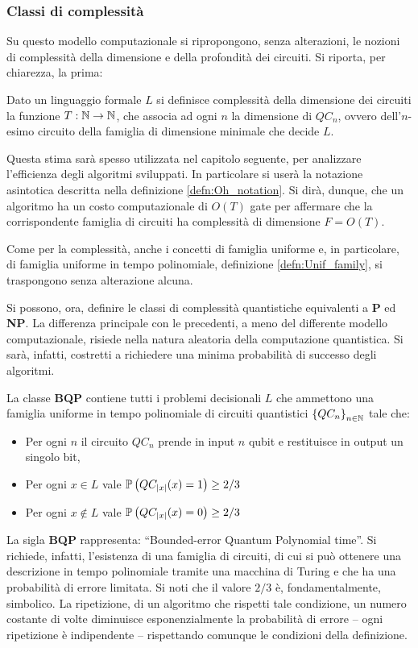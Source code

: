 \subsubsection{Classi di complessità}
Su questo modello computazionale si ripropongono, senza alterazioni, le nozioni di complessità della dimensione e della profondità dei circuiti.
Si riporta, per chiarezza, la prima:
\begin{defn}
 Dato un linguaggio formale $L$ si definisce {\upshape complessità della dimensione} dei circuiti la funzione $T: \N \to \N$, che associa ad ogni $n$ la dimensione di $QC_n$, ovvero dell'$n$-esimo circuito della famiglia di dimensione minimale che decide $L$.
\end{defn}
Questa stima sarà spesso utilizzata nel capitolo seguente, per analizzare l'efficienza degli algoritmi sviluppati.
In particolare si userà la notazione asintotica descritta nella definizione \ref{defn:Oh_notation}.
Si dirà, dunque, che un algoritmo ha un costo computazionale di $O(T)$ gate per affermare che la corrispondente famiglia di circuiti ha complessità di dimensione $F = O(T)$.

Come per la complessità, anche i concetti di famiglia uniforme e, in particolare, di famiglia uniforme in tempo polinomiale, definizione \ref{defn:Unif_family}, si traspongono senza alterazione alcuna.

Si possono, ora, definire le classi di complessità quantistiche equivalenti a \textbf{P} ed \textbf{NP}.
La differenza principale con le precedenti, a meno del differente modello computazionale, risiede nella natura aleatoria della computazione quantistica. Si sarà, infatti, costretti a richiedere una minima probabilità di successo degli algoritmi.
\begin{defn}\label{defn:BQP}
 La classe \textbf{BQP} contiene tutti i problemi decisionali $L$ che ammettono una famiglia uniforme in tempo polinomiale di circuiti quantistici $\left\{ QC_n \right\}_{n \in \N}$ tale che:
 \begin{itemize}
  \item Per ogni $n$ il circuito $QC_n$ prende in input $n$ qubit e restituisce in output un singolo bit,
  \item Per ogni $x \in L$ vale $\P\left(QC_{|x|}(x) = 1\right) \geq 2/3$
  \item Per ogni $x \notin L$ vale $\P\left(QC_{|x|}(x) = 0\right) \geq 2/3$
 \end{itemize}
\end{defn}
La sigla \textbf{BQP} rappresenta: ``Bounded-error Quantum Polynomial time''.
Si richiede, infatti, l'esistenza di una famiglia di circuiti, di cui si può ottenere una descrizione in tempo polinomiale tramite una macchina di Turing e che ha una probabilità di errore limitata.
Si noti che il valore $2/3$ è, fondamentalmente, simbolico.
La ripetizione, di un algoritmo che rispetti tale condizione, un numero costante di volte diminuisce esponenzialmente la probabilità di errore -- ogni ripetizione è indipendente -- rispettando comunque le condizioni della definizione.

